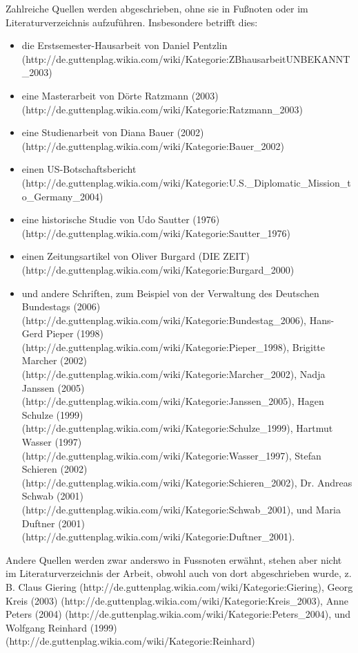 \documentclass[ngerman,final,fontsize=12pt,paper=a4,twoside,BCOR=8mm,draft=false]{scrartcl}
\begin{document}
Zahlreiche Quellen werden abgeschrieben, ohne sie in Fußnoten oder im Literaturverzeichnis aufzuführen. Insbesondere betrifft dies:
\begin{itemize}

\item die Erstsemester-Hausarbeit von Daniel Pentzlin (http://de.guttenplag.wikia.com/wiki/Kategorie:ZBhausarbeitUNBEKANNT\_2003)
\item eine Masterarbeit von Dörte Ratzmann (2003) (http://de.guttenplag.wikia.com/wiki/Kategorie:Ratzmann\_2003)
\item eine Studienarbeit von Diana Bauer (2002) (http://de.guttenplag.wikia.com/wiki/Kategorie:Bauer\_2002)
\item einen US-Botschaftsbericht (http://de.guttenplag.wikia.com/wiki/Kategorie:U.S.\_Diplomatic\_Mission\_to\_Germany\_2004)
\item eine historische Studie von Udo Sautter (1976) (http://de.guttenplag.wikia.com/wiki/Kategorie:Sautter\_1976)
\item einen Zeitungsartikel von Oliver Burgard (DIE ZEIT) (http://de.guttenplag.wikia.com/wiki/Kategorie:Burgard\_2000)

\item und andere Schriften, zum Beispiel von der Verwaltung des Deutschen Bundestags (2006) (http://de.guttenplag.wikia.com/wiki/Kategorie:Bundestag\_2006), Hans-Gerd Pieper (1998) (http://de.guttenplag.wikia.com/wiki/Kategorie:Pieper\_1998), Brigitte Marcher (2002) (http://de.guttenplag.wikia.com/wiki/Kategorie:Marcher\_2002), Nadja Janssen (2005) (http://de.guttenplag.wikia.com/wiki/Kategorie:Janssen\_2005), Hagen Schulze (1999) (http://de.guttenplag.wikia.com/wiki/Kategorie:Schulze\_1999), Hartmut Wasser (1997) (http://de.guttenplag.wikia.com/wiki/Kategorie:Wasser\_1997), Stefan Schieren (2002) (http://de.guttenplag.wikia.com/wiki/Kategorie:Schieren\_2002), Dr. Andreas Schwab (2001) (http://de.guttenplag.wikia.com/wiki/Kategorie:Schwab\_2001), und Maria Duftner (2001) (http://de.guttenplag.wikia.com/wiki/Kategorie:Duftner\_2001).
\end{itemize}
Andere Quellen werden zwar anderswo in Fussnoten erwähnt, stehen aber nicht im Literaturverzeichnis der Arbeit, obwohl auch von dort abgeschrieben wurde, z. B. Claus Giering (http://de.guttenplag.wikia.com/wiki/Kategorie:Giering), Georg Kreis (2003) (http://de.guttenplag.wikia.com/wiki/Kategorie:Kreis\_2003), Anne Peters (2004) (http://de.guttenplag.wikia.com/wiki/Kategorie:Peters\_2004), und Wolfgang Reinhard (1999) (http://de.guttenplag.wikia.com/wiki/Kategorie:Reinhard)
\end{document}
